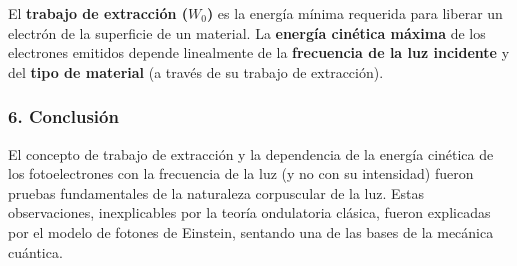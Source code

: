 \begin{cajaresultado}
El \textbf{trabajo de extracción ($W_0$)} es la energía mínima requerida para liberar un electrón de la superficie de un material.
La \textbf{energía cinética máxima} de los electrones emitidos depende linealmente de la \textbf{frecuencia de la luz incidente} y del \textbf{tipo de material} (a través de su trabajo de extracción).
\end{cajaresultado}

\subsubsection*{6. Conclusión}
\begin{cajaconclusion}
El concepto de trabajo de extracción y la dependencia de la energía cinética de los fotoelectrones con la frecuencia de la luz (y no con su intensidad) fueron pruebas fundamentales de la naturaleza corpuscular de la luz. Estas observaciones, inexplicables por la teoría ondulatoria clásica, fueron explicadas por el modelo de fotones de Einstein, sentando una de las bases de la mecánica cuántica.
\end{cajaconclusion}

\newpage